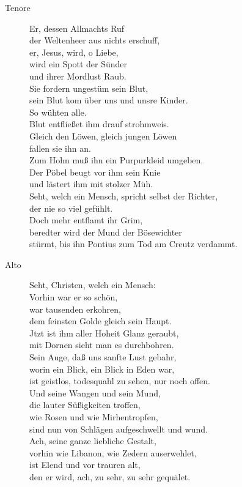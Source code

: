\documentclass[parskip=full]{scrreprt}
\begin{document}
\begin{description}
	\item[Tenore]
	Er, dessen Allmachts Ruf\\
	der Weltenheer aus nichts erschuff,\\
	er, Jesus, wird, o Liebe,\\
	wird ein Spott der Sünder\\
	und ihrer Mordlust Raub.\\
	Sie fordern ungestüm sein Blut,\\
	sein Blut kom über uns und unsre Kinder.\\
	So wühten alle.\\
	Blut entfließet ihm drauf strohmweis.\\
	Gleich den Löwen, gleich jungen Löwen\\
	fallen sie ihn an.\\
	Zum Hohn muß ihn ein Purpurkleid umgeben.\\
	Der Pöbel beugt vor ihm sein Knie\\
	und lästert ihm mit stolzer Müh.\\
	Seht, welch ein Mensch, spricht selbst der Richter,\\
	der nie so viel gefühlt.\\
	Doch mehr entflamt ihr Grim,\\
	beredter wird der Mund der Bösewichter\\
	stürmt, bis ihn Pontius zum Tod am Creutz verdammt.
	
	\item[Alto]
	Seht, Christen, welch ein Mensch:\\
	Vorhin war er so schön,\\
	war tausenden erkohren,\\
	dem feinsten Golde gleich sein Haupt.\\
	Jtzt ist ihm aller Hoheit Glanz geraubt,\\
	mit Dornen sieht man es durchbohren.\\
	Sein Auge, daß uns sanfte Lust gebahr,\\
	worin ein Blick, ein Blick in Eden war,\\
	ist geistlos, todesquahl zu sehen, nur noch offen.\\
	Und seine Wangen und sein Mund,\\
	die lauter Süßigkeiten troffen,\\
	wie Rosen und wie Mirhentropfen,\\
	sind nun von Schlägen aufgeschwellt und wund.\\
	Ach, seine ganze liebliche Gestalt,\\
	vorhin wie Libanon, wie Zedern auserwehlet,\\
	ist Elend und vor trauren alt,\\
	den er wird, ach, zu sehr, zu sehr gequälet.
\end{description}
\end{document}

